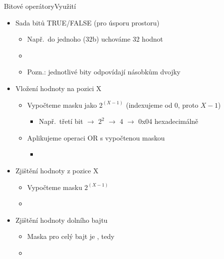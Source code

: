 \begin{frame}{Bitové operátory}{Využití}

  \begin{itemize}
    \item Sada bitů TRUE/FALSE (pro úsporu prostoru)
    \begin{itemize}
      \item Např.\ do jednoho  (32b) uchováme 32 hodnot
      \item {}
      \item Pozn.: jednotlivé bity odpovídají násobkům dvojky
    \end{itemize}

    \pause

    \item Vložení hodnoty na pozici X
    \begin{itemize}
      \item Vypočteme masku jako $2^{(X-1)}$ (indexujeme od 0, proto $X - 1$)
      \begin{itemize}
	\item Např.\ třetí bit $\rightarrow$ $2^2$ $\rightarrow$ 4
	  $\rightarrow$ 0x04 hexadecimálně
      \end{itemize}

      \pause

      \item Aplikujeme operaci OR s vypočtenou maskou
      \begin{itemize}
	\item {}
      \end{itemize}
    \end{itemize}

    \pause

    \item Zjištění hodnoty z pozice X
    \begin{itemize}
      \item Vypočteme masku $2^{(X-1)}$
      \item {}
    \end{itemize}

    \pause

    \item Zjištění hodnoty dolního bajtu
    \begin{itemize}
      \item Maska pro celý bajt je , tedy 
      \item {}
    \end{itemize}
  \end{itemize}

\end{frame}

